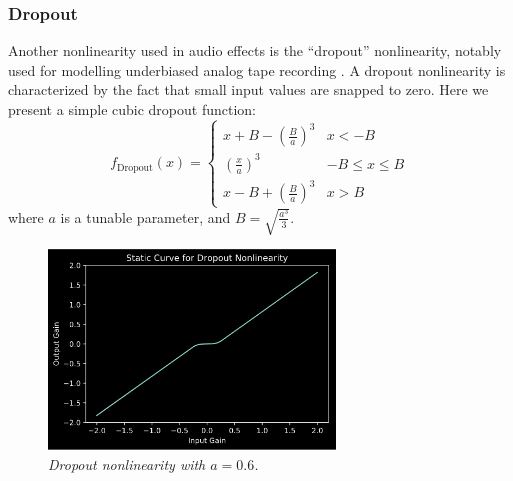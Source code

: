\documentclass[twoside,a4paper]{article}
\begin{document}
\subsubsection{Dropout} \label{sec:drop}
%
Another nonlinearity used in audio effects is the ``dropout'' nonlinearity,
notably used for modelling underbiased analog tape recording \cite{DAFX-tape}.
A dropout nonlinearity is characterized by the fact that small input values
are snapped to zero. Here we present a simple cubic dropout function:
%
\begin{equation}
    f_{\text{Dropout}}(x) = \begin{cases}
        x + B - \left(\frac{B}{a}\right)^3& x < -B \\
        \left(\frac{x}{a}\right)^3& -B \leq x \leq B \\
        x - B + \left(\frac{B}{a}\right)^3& x > B
    \end{cases}
    \label{eq:dropout}
\end{equation}
%
where $a$ is a tunable parameter, and $B = \sqrt{\frac{a^3}{3}}$.
%
\begin{figure}[h]
    \center
    \includegraphics[width=3in]{Pics/dropout.png}
    \caption{\label{Drops}{\it Dropout nonlinearity with $a = 0.6$.}}
\end{figure}
%
\end{document}
